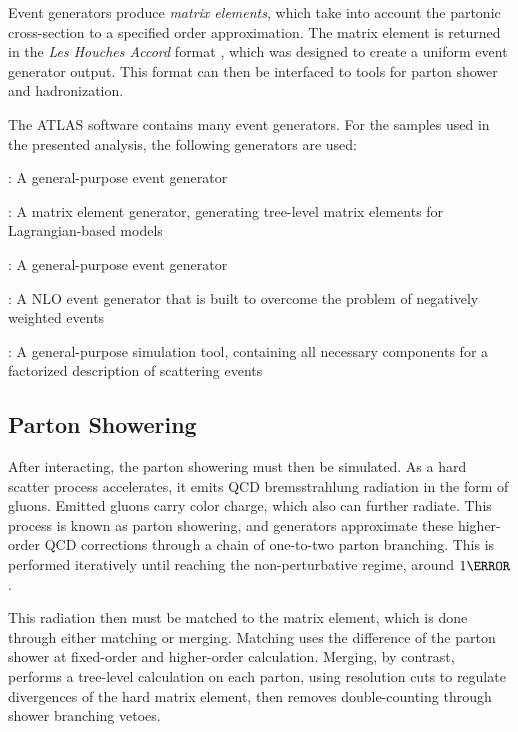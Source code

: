Event generators produce \textit{matrix elements}, which take into account the partonic cross-section to a specified order approximation. The matrix element is returned in the \textit{Les Houches Accord} format \cite{les-houches}, which was designed to create a uniform event generator output. This format can then be interfaced to tools for parton shower and hadronization.

The ATLAS software contains many event generators. For the samples used in the presented analysis, the following generators are used:

\begin{description}
    \item \HERWIGpp: A general-purpose event generator \cite{herwigpp}
    \item \MADGRAPH: A matrix element generator, generating tree-level matrix elements for Lagrangian-based models \cite{mg5}
    \item \PYTHIA: A general-purpose event generator  \cite{pythia8.2}
    \item \POWHEG: A \gls{NLO} event generator that is built to overcome the problem of negatively weighted events \cite{powheg} %
    \item \SHERPA: A general-purpose simulation tool, containing all necessary components for a factorized description of scattering events \cite{sherpa2.2}
\end{description}

\subsection{Parton Showering} \label{ssec:partonshower} %
After interacting, the parton showering must then be simulated. As a hard scatter process accelerates, it emits \gls{QCD} bremsstrahlung radiation in the form of gluons. Emitted gluons carry color charge, which also can further radiate. This process is known as parton showering, and generators approximate these higher-order \gls{QCD} corrections through a chain of one-to-two parton branching. This is performed iteratively until reaching the non-perturbative regime, around $\unit{1}{\GeV}$.

This radiation then must be matched to the matrix element, which is done through either matching or merging. Matching uses the difference of the parton shower at fixed-order and higher-order calculation. Merging, by contrast, performs a tree-level calculation on each parton, using resolution cuts to regulate divergences of the hard matrix element, then removes double-counting through shower branching vetoes.

